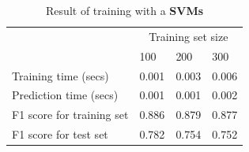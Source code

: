 \documentclass[12pt]{article}
\begin{document}
\setlength{\extrarowheight}{1.5pt}
\begin{table}[!htbp]
\caption{Result of training with a \textbf{SVMs}} %
\centering %
\begin{tabular}{|p{6cm}|p{1.5cm}|p{1.5cm}|p{1.5cm}|} %
\hline %
& \multicolumn{3}{c|}{Training set size}\\[5pt]
\cline{2-4} 
& 100 & 200 & 300\\[0.5ex]
\hline %

Training time (secs)          &0.001&0.003&0.006\\
Prediction time (secs)        &0.001&0.001&0.002\\
F1 score for training set     &0.886&0.879&0.877\\
F1 score for test set         &0.782&0.754&0.752\\
\hline %
\end{tabular}
\label{svmTable}
\end{table}
\end{document}
